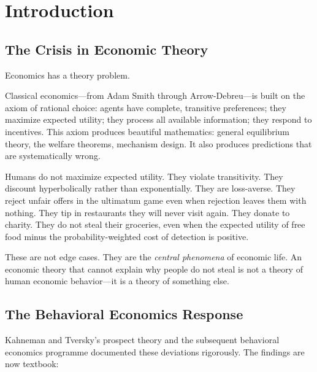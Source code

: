 \documentclass[12pt]{article}
\theoremstyle{definition}
\theoremstyle{remark}
\begin{document}
\newpage
\tableofcontents
\newpage


\section{Introduction}
\label{sec:intro}

\subsection{The Crisis in Economic Theory}

Economics has a theory problem.

Classical economics---from Adam Smith through Arrow-Debreu---is built on the axiom of rational choice: agents have complete, transitive preferences; they maximize expected utility; they process all available information; they respond to incentives.  This axiom produces beautiful mathematics: general equilibrium theory, the welfare theorems, mechanism design.  It also produces predictions that are systematically wrong.

Humans do not maximize expected utility.  They violate transitivity.  They discount hyperbolically rather than exponentially.  They are loss-averse.  They reject unfair offers in the ultimatum game even when rejection leaves them with nothing.  They tip in restaurants they will never visit again.  They donate to charity.  They do not steal their groceries, even when the expected utility of free food minus the probability-weighted cost of detection is positive.

These are not edge cases.  They are the \emph{central phenomena} of economic life.  An economic theory that cannot explain why people do not steal is not a theory of human economic behavior---it is a theory of something else.

\subsection{The Behavioral Economics Response}

Kahneman and Tversky's prospect theory \cite{kahneman1979} and the subsequent behavioral economics programme \cite{kahneman2011,thaler2008} documented these deviations rigorously.  The findings are now textbook:
\end{document}

